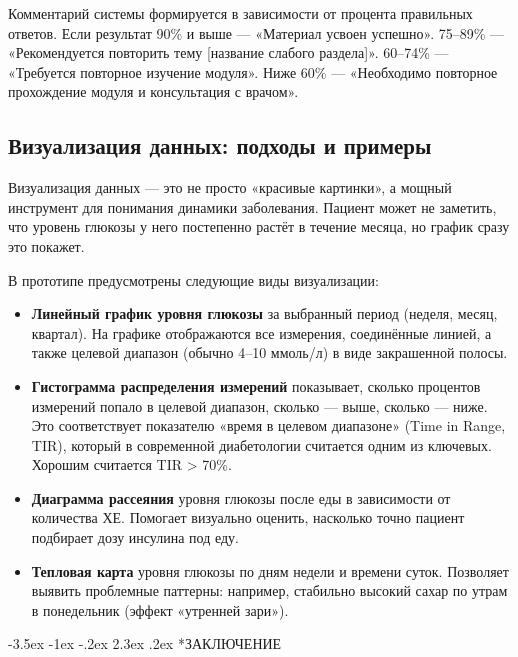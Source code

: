 \documentclass[14pt, a4paper]{extarticle}
\makeatletter
\renewcommand\section{\@startsection {section}{1}{\z@}%
{-3.5ex \@plus -1ex \@minus -.2ex}%
{2.3ex \@plus.2ex}%
{\centering\normalfont\Large\bfseries}}
\makeatother
\begin{document}
\noindent Комментарий системы формируется в зависимости от процента правильных ответов. Если результат 90\% и выше — «Материал усвоен успешно». 75–89\% — «Рекомендуется повторить тему [название слабого раздела]». 60–74\% — «Требуется повторное изучение модуля». Ниже 60\% — «Необходимо повторное прохождение модуля и консультация с врачом».
\vskip 5cm
\subsection{Визуализация данных: подходы и примеры}

\noindent Визуализация данных — это не просто «красивые картинки», а мощный инструмент для понимания динамики заболевания. Пациент может не заметить, что уровень глюкозы у него постепенно растёт в течение месяца, но график сразу это покажет.

\medskip
\noindent В прототипе предусмотрены следующие виды визуализации:

\begin{itemize}
\item \textbf{Линейный график уровня глюкозы} за выбранный период (неделя, месяц, квартал). На графике отображаются все измерения, соединённые линией, а также целевой диапазон (обычно 4–10 ммоль/л) в виде закрашенной полосы.

\item \textbf{Гистограмма распределения измерений} показывает, сколько процентов измерений попало в целевой диапазон, сколько — выше, сколько — ниже. Это соответствует показателю «время в целевом диапазоне» (Time in Range, TIR), который в современной диабетологии считается одним из ключевых. Хорошим считается TIR > 70\%.

\item \textbf{Диаграмма рассеяния} уровня глюкозы после еды в зависимости от количества ХЕ. Помогает визуально оценить, насколько точно пациент подбирает дозу инсулина под еду.

\item \textbf{Тепловая карта} уровня глюкозы по дням недели и времени суток. Позволяет выявить проблемные паттерны: например, стабильно высокий сахар по утрам в понедельник (эффект «утренней зари»).
\end{itemize}

\newpage
{}
\section*{ЗАКЛЮЧЕНИЕ}
\end{document}
